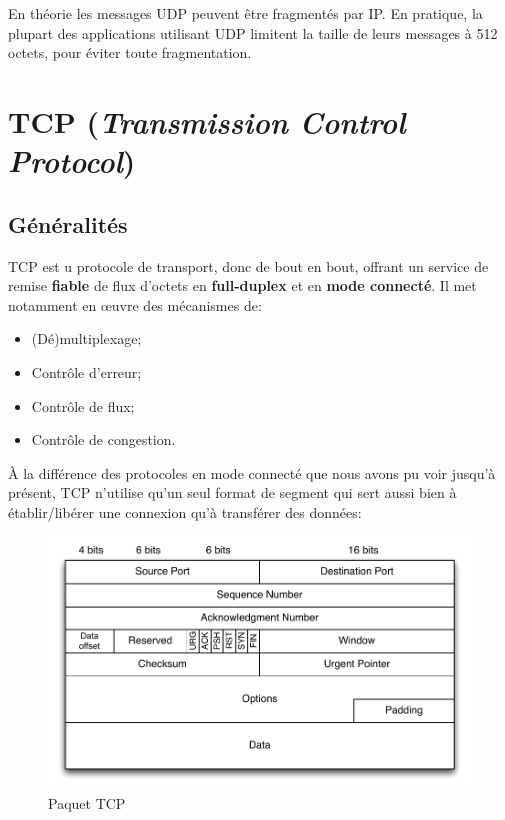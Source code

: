 \documentclass[11pt,english,french]{scrreprt}
\theoremstyle{remark}
\theoremstyle{definition}
\begin{document}
En théorie les messages UDP peuvent être fragmentés par IP. En pratique, la plupart des applications utilisant UDP limitent la taille de leurs messages à 512 octets, pour éviter toute fragmentation.

\section{TCP (\emph{Transmission Control Protocol})} %

\subsection{Généralités} %

TCP est u protocole de transport, donc de bout en bout, offrant un service de remise \textbf{fiable} de flux d'octets en \textbf{full-duplex} et en \textbf{mode connecté}. Il met notamment en œuvre des mécanismes de:
\begin{itemize}
	\item (Dé)multiplexage;
	\item Contrôle d'erreur;
	\item Contrôle de flux;
	\item Contrôle de congestion.
\end{itemize}

À la différence des protocoles en mode connecté que nous avons pu voir jusqu'à présent, TCP n'utilise qu'un seul format de segment qui sert aussi bien à établir/libérer une connexion qu'à transférer des données:
\begin{figure}[h!]
	\center
	\includegraphics[scale=.75]{graphes/TCP/paquet_TCP}
	\caption{Paquet TCP}
\end{figure}
\end{document}
